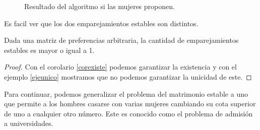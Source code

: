 \begin{eje}
\begin{figure}[H]

\caption{Resultado del algoritmo si las mujeres proponen.}
\end{figure}

Es facil ver que los dos emparejamientos estables son distintos.
\fin
\end{eje}

\begin{cor}
Dada una matriz de preferencias arbitraria, la cantidad de emparejamientos estables es mayor o igual a 1. 
\end{cor}
\begin{proof}
Con el corolario \ref{corexiste} podemos garantizar la existencia y con el ejemplo \ref{ejeunico} mostramos que no podemos garantizar la unicidad de este.
\end{proof}

Para continuar, podemos generalizar el problema del matrimonio estable a uno que permite a los hombres casarse con varias mujeres cambiando su cota superior de uno a cualquier otro número. Este es conocido como el problema de admisión a universidades. 

